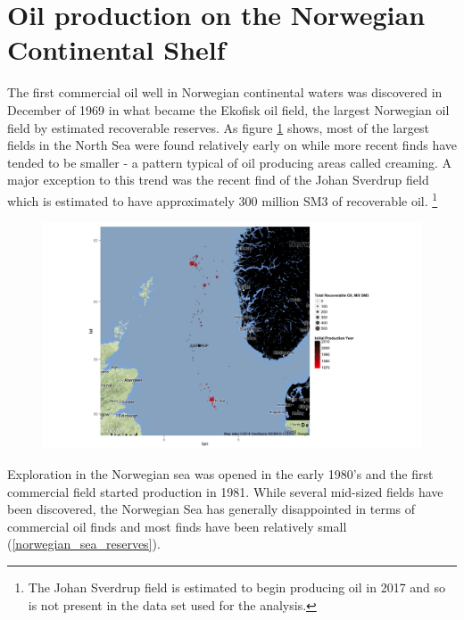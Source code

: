 \documentclass[12pt]{article}
\begin{document}
\section{Oil production on the Norwegian Continental Shelf}
The first commercial oil well in Norwegian continental waters was discovered in December of 1969 in what became the Ekofisk oil field, the largest Norwegian oil field by estimated recoverable reserves.  As figure \ref{north_sea_reserves} shows, most of the largest fields in the North Sea were found relatively early on while more recent finds have tended to be smaller - a pattern typical of oil producing areas called creaming.  A major exception to this trend was the recent find of the Johan Sverdrup field which is estimated to have approximately 300 million SM3 of recoverable oil. \footnote{The Johan Sverdrup field is estimated to begin producing oil in 2017 and so is not present in the data set used for the analysis.}  

\begin{figure}
\includegraphics[width=1\textwidth]{figures/north_sea_reserves_print.png}
\caption{}
\label{north_sea_reserves}
\end{figure}

Exploration in the Norwegian sea was opened in the early 1980’s and the first commercial field started production in 1981.  While several mid-sized fields have been discovered, the Norwegian Sea has generally disappointed in terms of commercial oil finds and most finds have been relatively small (\ref{norwegian_sea_reserves}).  
\end{document}
